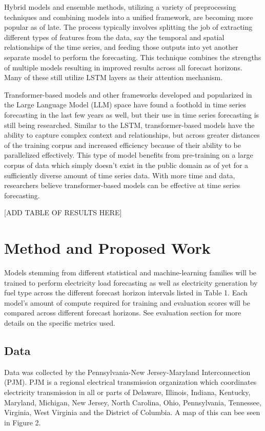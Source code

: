 \documentclass[sigconf]{acmart}
\begin{document}
Hybrid models and ensemble methods, utilizing a variety of preprocessing techniques and combining models into a unified framework, are becoming more popular as of late. The process typically involves splitting the job of extracting different types of features from the data, say the temporal and spatial relationships of the time series, and feeding those outputs into yet another separate model to perform the forecasting.\cite{Hua23} This technique combines the strengths of multiple models resulting in improved results across all forecast horizons.\cite{Hua23, Hopf23} Many of these still utilize LSTM layers as their attention mechanism.\cite{Sun22}

Transformer-based models and other frameworks developed and popularized in the Large Language Model (LLM) space have found a foothold in time series forecasting in the last few years as well, but their use in time series forecasting is still being researched.\cite{Zeng22} Similar to the LSTM, transformer-based models have the ability to capture complex context and relationships, but across greater distances of the training corpus and increased efficiency because of their ability to be parallelized effectively.\cite{Zheng24} This type of model benefits from pre-training on a large corpus of data which simply doesn't exist in the public domain as of yet for a sufficiently diverse amount of time series data.\cite{Hug24} With more time and data, researchers believe transformer-based models can be effective at time series forecasting. \cite{Hug24, Zheng24}

[ADD TABLE OF RESULTS HERE]

\section{Method and Proposed Work}
Models stemming from different statistical and machine-learning families will be trained to perform electricity load forecasting as well as electricity generation by fuel type across the different forecast horizon intervals listed in Table 1. Each model's amount of compute required for training and evaluation scores will be compared across different forecast horizons. See evaluation section for more details on the specific metrics used.

  \subsection{Data}
  Data was collected by the Pennsylvania-New Jersey-Maryland Interconnection (PJM). PJM is a regional electrical transmission organization which coordinates electricity transmission in all or parts of Delaware, Illinois, Indiana, Kentucky, Maryland, Michigan, New Jersey, North Carolina, Ohio, Pennsylvania, Tennessee, Virginia, West Virginia and the District of Columbia.\cite{PJMZone24} A map of this can bee seen in Figure 2.
  
\end{document}
